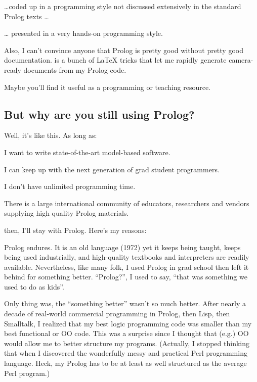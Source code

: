 \item

\dots coded up in a programming style not discussed extensively in
the standard Prolog texts {\ldots}

\item {\ldots} presented in a very hands-on programming style. \ei

Also, I can't convince anyone that Prolog is pretty good without
pretty good documentation. {\PROD} is a bunch of {\LaTeX} tricks that
let me rapidly generate camera-ready documents from my Prolog code.

Maybe you'll
find it useful as a programming or teaching resource.



\subsection{ But why are you still using Prolog?}

Well, it's like this. As long as:

\bi


\item

I want to write state-of-the-art model-based software.

\item

I can keep up with the next generation of grad student programmers.

\item

I don't have unlimited programming time.

\item

There is a large international community of educators, researchers and vendors
supplying high quality Prolog materials.

\ei

\noindent
then, I'll stay with Prolog.  Here's my reasons:

Prolog endures. It is an old language (1972) yet it keeps being taught, keeps being used industrially,  and high-quality textbooks and interpreters are readily available.
Nevertheless,
like many folk, I used Prolog in grad school then left it behind for something better.
``Prolog?'',
I used to say, ``that was something we used to do as kids''.

Only
thing was, the ``something better'' wasn't so much better. After nearly a decade  of real-world
commercial programming in Prolog, then Lisp, then Smalltalk, I realized
that my best logic programming code was smaller than my best functional or OO code.
This was a surprise since I thought that (e.g.) OO would allow me to better structure my programs. (Actually, I stopped thinking that when I discovered the wonderfully messy and practical Perl programming language.
Heck, my Prolog has to be at least as well structured as the average Perl program.)


